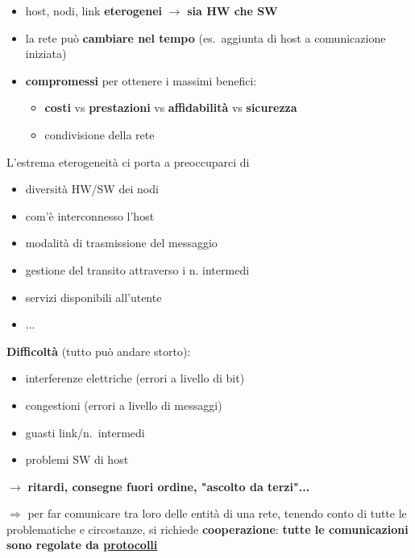 \begin{itemize}
  \item host, nodi, link \textbf{eterogenei} $\rightarrow$ \textbf{sia HW che SW}
  \item la rete pu\`o \textbf{cambiare nel tempo} (es.~aggiunta di host a comunicazione iniziata)
  \item \textbf{compromessi} per ottenere i massimi benefici:
  \begin{itemize}
    \item \textbf{costi} vs \textbf{prestazioni} vs \textbf{affidabilit\`a} vs \textbf{sicurezza}
    \item condivisione della rete
  \end{itemize}
\end{itemize}
\newpage %
L'estrema eterogeneit\`a ci porta a preoccuparci di
\begin{multicols}{2}
\begin{itemize}
  \item diversit\`a HW/SW dei nodi
  \item com'\`e interconnesso l'host
  \item modalit\`a di trasmissione del messaggio
  \item gestione del transito attraverso i n. intermedi
  \item servizi disponibili all'utente
  \item ...
\end{itemize}
\end{multicols}

\textbf{Difficolt\`a} (tutto pu\`o andare storto):
\begin{multicols}{2}
\begin{itemize}
  \item interferenze elettriche (errori a livello di bit)
  \item congestioni (errori a livello di messaggi)
  \item guasti link/n.~intermedi
  \item problemi SW di host
\end{itemize}
\end{multicols}


$\rightarrow$ \textbf{ritardi, consegne fuori ordine, "ascolto da terzi"...}

$\Rightarrow$ per far comunicare tra loro delle entit\`a di una rete, tenendo conto di tutte le problematiche e circostanze, si richiede \textbf{cooperazione}: \textbf{tutte le comunicazioni sono regolate da \underline{protocolli}}

